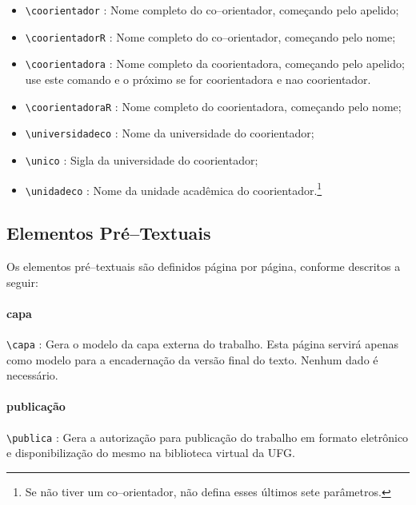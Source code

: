 \begin{itemize}

\item \verb|\coorientador| : Nome completo do co--orientador, começando pelo apelido;
\item \verb|\coorientadorR| : Nome completo do co--orientador, começando pelo nome;

\item \verb|\coorientadora| : Nome completo da coorientadora, começando pelo apelido; use este comando e o próximo se for coorientadora e nao coorientador.
\item \verb|\coorientadoraR| : Nome completo do coorientadora, começando pelo nome;

\item \verb|\universidadeco| : Nome da universidade do coorientador;
\item \verb|\unico| : Sigla da universidade do coorientador;
\item \verb|\unidadeco| : Nome da unidade acadêmica do coorientador.\footnote{Se não tiver um co--orientador, não defina esses últimos sete parâmetros.}
\end{itemize}

\subsection{Elementos Pré--Textuais}
\label{sec:pre}
Os elementos pré--textuais são definidos página por página, conforme descritos a seguir:

\paragraph{capa\\}
\verb|\capa| : Gera o modelo da capa externa do trabalho. Esta página servirá apenas como modelo para a encadernação da versão final do texto. Nenhum dado é necessário.

\paragraph{publicação\\}
\verb|\publica| : Gera a autorização para publicação do trabalho em formato eletrônico e disponibilização do mesmo na biblioteca virtual da UFG.

